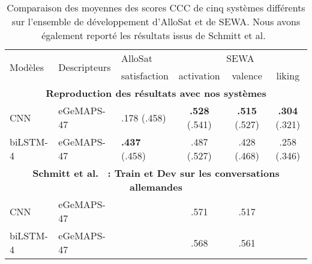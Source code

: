 \begin{table}[h]
  \centering
\begin{tabular}{|l|l|l|c|c|c|}
\hline
\multirow{2}{*}{Modèles} & \multirow{2}{*}{Descripteurs} & AlloSat                               & \multicolumn{3}{c|}{SEWA}                                                                                             \\ \cline{3-6}
                         &                               & satisfaction                          & activation                            & valence                               & liking                                \\ \hline
\multicolumn{6}{|c|}{\textbf{Reproduction des résultats avec nos systèmes}}                                                                                                                                              \\ \hline
CNN                      & eGeMAPS-47                    & .178 (.458)                           & \textbf{.528} (.541) & \textbf{.515} (.527) & \textbf{.304} (.321) \\
biLSTM-4                 & eGeMAPS-47                    & \textbf{.437} (.458) & .487 (.527)                           & .428 (.468)                           & .258 (.346)                           \\ \hline
\multicolumn{6}{|c|}{\textbf{Schmitt et al.~\cite{Schmitt2019} : Train et Dev sur les conversations allemandes}}                                                                                                           \\ \hline
CNN                      & eGeMAPS-47                    &                                       & .571                                  & .517                                  &                                       \\
biLSTM-4                 & eGeMAPS-47                    &                                       & .568                                  & .561                                  &                                       \\ \hline
\end{tabular}
\caption{Comparaison des moyennes des scores CCC de cinq systèmes différents sur l'ensemble de développement d'AlloSat et de SEWA. Nous avons également reporté les résultats issus de Schmitt et al.~\cite{Schmitt2019}}
\label{tab:cnnVSbilstm}
\end{table}
